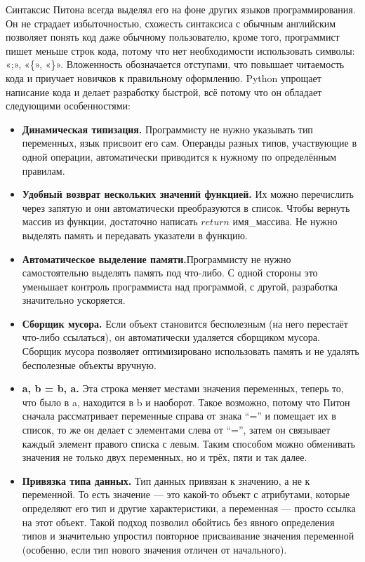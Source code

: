 \documentclass[a4paper]{article}
\begin{document}
	Синтаксис Питона всегда выделял его на фоне других языков программирования. Он не страдает избыточностью, схожесть синтаксиса с обычным английским позволяет понять код даже обычному пользователю, кроме того, программист пишет меньше строк кода, потому что нет необходимости использовать символы: «;», «\{», «\}». Вложенность обозначается отступами, что повышает читаемость кода и приучает новичков к правильному оформлению.
	Python упрощает написание кода и делает разработку быстрой, всё потому что он обладает следующими особенностями:
	\begin{itemize}
		\item {\bf Динамическая типизация.} Программисту не нужно указывать тип переменных, язык присвоит его сам. Операнды разных типов, участвующие в одной операции, автоматически приводится к нужному по определённым правилам.
		\item{\bf Удобный возврат нескольких значений функцией.} Их можно перечислить через запятую и они автоматически преобразуются в список. Чтобы вернуть массив из функции, достаточно написать $ return$ имя\_массива. Не нужно выделять память и передавать указатели в функцию.
		\item {\bf Автоматическое выделение памяти.}Программисту не нужно самостоятельно выделять память под что-либо. С одной стороны это уменьшает контроль программиста над программой, с другой, разработка значительно ускоряется.
		\item {\bf Сборщик мусора.} Если объект становится бесполезным (на него перестаёт что-либо ссылаться), он автоматически удаляется сборщиком мусора. Сборщик мусора позволяет оптимизировано использовать память и не удалять бесполезные объекты вручную.
		\item {\bf a, b = b, a.} 
		Эта строка меняет местами значения переменных, теперь то, что было в a, находится в b и наоборот. Такое возможно, потому что Питон сначала рассматривает переменные справа от знака “=” и помещает их в список, то же он делает с элементами слева от “=”, затем он связывает каждый элемент правого списка с левым. Таким способом можно обменивать значения не только двух переменных, но и трёх, пяти и так далее.
		\item {\bf Привязка типа данных.} Тип данных привязан к значению, а не к переменной. То есть значение — это какой-то объект с атрибутами, которые определяют его тип и другие характеристики, а переменная — просто ссылка на этот объект. Такой подход позволил обойтись без явного определения типов и значительно упростил повторное присваивание значения переменной (особенно, если тип нового значения отличен от начального).

\end{itemize}
\end{document}
